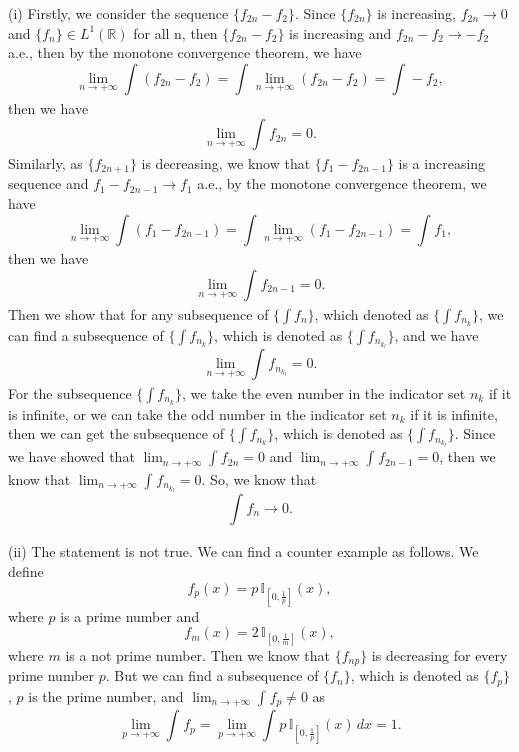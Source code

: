 \documentclass[12pt,a4paper]{ctexart}
\begin{document}
(i) Firstly, we consider the sequence $\{f_{2n} - f_{2}\}$. Since $\{f_{2n}\}$ is increasing, $f_{2n} \to 0$ and $\{f_{n}\} \in L^{1}(\mathbb{R})$ for all n, then $\{f_{2n} - f_{2}\}$ is increasing and $f_{2n} - f_{2} \to -f_{2}$ a.e., then by the monotone convergence theorem, we have
\begin{equation*}
    \lim_{n \to + \infty} \int_{}^{} (f_{2n} - f_{2}) =  \int_{}^{} \lim_{n \to + \infty} (f_{2n} - f_{2}) = \int_{}^{}  - f_{2},
\end{equation*}
then we have
\begin{equation*}
    \lim_{n \to + \infty} \int_{}^{} f_{2n} =  0.
\end{equation*}
Similarly, as $\{f_{2n + 1} \}$ is decreasing, we know that  $\{f_{1} - f_{2n -1} \}$ is a increasing sequence and $f_{1} - f_{2n-1} \to f_{1}$ a.e., by the monotone convergence theorem, we have
\begin{equation*}
    \lim_{n \to + \infty} \int_{}^{} (f_{1} - f_{2n-1}) =  \int_{}^{} \lim_{n \to + \infty} (f_{1} - f_{2n-1}) = \int_{}^{}  f_{1},
\end{equation*}
then we have
\begin{equation*}
    \lim_{n \to + \infty} \int_{}^{} f_{2n-1} =  0.
\end{equation*}
Then we show that for any subsequence of $\{\int f_{n}\}$, which denoted as $\{\int f_{n_{k}}\}$, we can find a subsequence of $\{\int f_{n_{k}}\}$, which is denoted as $\{\int f_{n_{k_{l}}}\}$, and we have
\begin{equation*}
    \lim_{n \to + \infty} \int_{}^{} f_{n_{k_{l}}} =  0.
\end{equation*}
For the subsequence $\{\int f_{n_{k}}\}$, we take the even number in the indicator set ${n_{k}}$ if it is infinite, or we can take the odd number in the indicator set ${n_{k}}$ if it is infinite, then we can get the subsequence of $\{\int f_{n_{k}}\}$, which is denoted as $\{\int f_{n_{k_{l}}}\}$. Since we have showed that $\lim_{n \to + \infty} \int_{}^{} f_{2n} =  0$ and $\lim_{n \to + \infty} \int_{}^{} f_{2n-1} =  0$, then we know that $\lim_{n \to + \infty} \int_{}^{} f_{n_{k_{l}}} =  0$. So, we know that
\begin{equation*}
    \int_{}^{} f_{n} \to 0.
\end{equation*}

(ii) The statement is not true. We can find a counter example as follows. We define
\begin{equation*}
    f_{p} (x) = p \, \mathbb{I}_{[0, \frac{1}{p}]} (x),
\end{equation*}
where $p$ is a prime number and
\begin{equation*}
    f_{m} (x) = 2 \, \mathbb{I}_{[0, \frac{1}{m}]} (x),
\end{equation*}
where $m$ is a not prime number. Then we know that $\{f_{np}\}$ is decreasing for every prime number $p$. But we can find a subsequence of $\{f_{n}\}$, which is denoted as $\{f_{p}\}$, $p$ is the prime number, and $\lim_{n \to + \infty} \int_{}^{} f_{p} \neq 0$ as
\begin{equation*}
    \lim_{p \to + \infty} \int_{}^{} f_{p} = \lim_{p \to + \infty} \int_{}^{} p \, \mathbb{I}_{[0, \frac{1}{p}]} (x) \, d x = 1.
\end{equation*}
\end{document}
